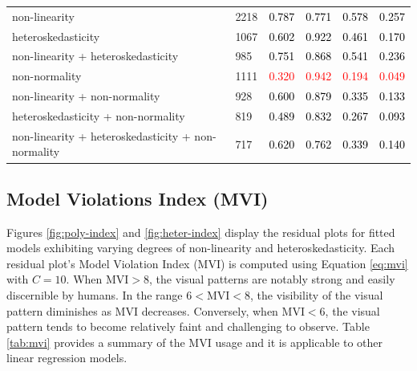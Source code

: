 \documentclass[]{interact}
\theoremstyle{plain}%
\theoremstyle{definition}
\theoremstyle{remark}
\begin{document}
\begin{table}
{\begin{tabular}[t]{ll>{}l>{}l>{}l>{}l}
\hspace{1em}non-linearity & 2218 & \textcolor{black}{0.787} & \textcolor{black}{0.771} & \textcolor{black}{0.578} & \textcolor{black}{0.257}\\
\hspace{1em}heteroskedasticity & 1067 & \textcolor{black}{0.602} & \textcolor{black}{0.922} & \textcolor{black}{0.461} & \textcolor{black}{0.170}\\
\hspace{1em}non-linearity + heteroskedasticity & 985 & \textcolor{black}{0.751} & \textcolor{black}{0.868} & \textcolor{black}{0.541} & \textcolor{black}{0.236}\\
\hspace{1em}non-normality & 1111 & \textcolor{red}{0.320} & \textcolor{red}{0.942} & \textcolor{red}{0.194} & \textcolor{red}{0.049}\\
\hspace{1em}non-linearity + non-normality & 928 & \textcolor{black}{0.600} & \textcolor{black}{0.879} & \textcolor{black}{0.335} & \textcolor{black}{0.133}\\
\hspace{1em}heteroskedasticity + non-normality & 819 & \textcolor{black}{0.489} & \textcolor{black}{0.832} & \textcolor{black}{0.267} & \textcolor{black}{0.093}\\
\hspace{1em}non-linearity + heteroskedasticity + non-normality & 717 & \textcolor{black}{0.620} & \textcolor{black}{0.762} & \textcolor{black}{0.339} & \textcolor{black}{0.140}\\
\bottomrule
\end{tabular}}
\end{table}

\hypertarget{model-violations-index-mvi}{%
\subsection{Model Violations Index
(MVI)}\label{model-violations-index-mvi}}

Figures \ref{fig:poly-index} and \ref{fig:heter-index} display the
residual plots for fitted models exhibiting varying degrees of
non-linearity and heteroskedasticity. Each residual plot's Model
Violation Index (MVI) is computed using Equation \ref{eq:mvi} with
\(C = 10\). When \(\text{MVI} > 8\), the visual patterns are notably
strong and easily discernible by humans. In the range
\(6 < \text{MVI} < 8\), the visibility of the visual pattern diminishes
as MVI decreases. Conversely, when \(\text{MVI} < 6\), the visual
pattern tends to become relatively faint and challenging to observe.
Table \ref{tab:mvi} provides a summary of the MVI usage and it is
applicable to other linear regression models.
\end{document}
